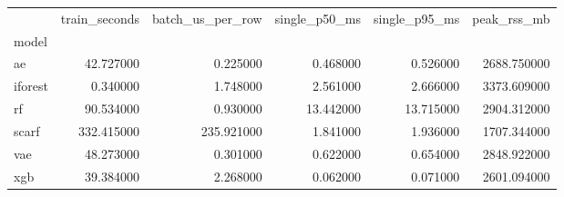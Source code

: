 \begin{tabular}{lrrrrr}
\toprule
 & train_seconds & batch_us_per_row & single_p50_ms & single_p95_ms & peak_rss_mb \\
model &  &  &  &  &  \\
\midrule
ae & 42.727000 & 0.225000 & 0.468000 & 0.526000 & 2688.750000 \\
iforest & 0.340000 & 1.748000 & 2.561000 & 2.666000 & 3373.609000 \\
rf & 90.534000 & 0.930000 & 13.442000 & 13.715000 & 2904.312000 \\
scarf & 332.415000 & 235.921000 & 1.841000 & 1.936000 & 1707.344000 \\
vae & 48.273000 & 0.301000 & 0.622000 & 0.654000 & 2848.922000 \\
xgb & 39.384000 & 2.268000 & 0.062000 & 0.071000 & 2601.094000 \\
\bottomrule
\end{tabular}
